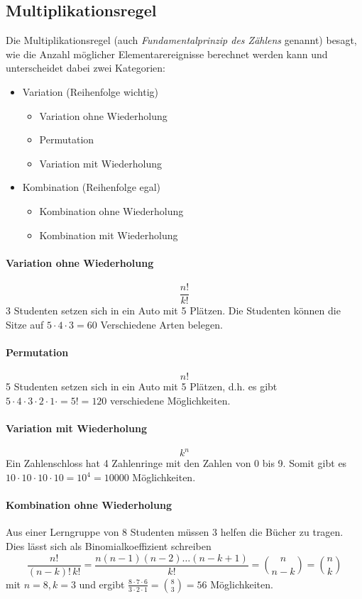 \subsection{Multiplikationsregel}\label{sec:multiplikationsregel}
Die \gls{Multiplikationsregel} (auch \emph{Fundamentalprinzip des 
Zählens} genannt) besagt, wie die Anzahl möglicher Elementarereignisse
berechnet werden kann und unterscheidet dabei zwei Kategorien:
\begin{itemize}
	\item \gls{Variation} \hfill{} (Reihenfolge wichtig)
	\begin{itemize}
		\item Variation ohne Wiederholung
		\item \gls{Permutation}
		\item Variation mit Wiederholung
	\end{itemize}
	\item \gls{Kombination} \hfill{} (Reihenfolge egal)
	\begin{itemize}
		\item Kombination ohne Wiederholung
		\item Kombination mit Wiederholung
	\end{itemize}
\end{itemize}

\paragraph{Variation ohne Wiederholung}
\[ 
	\frac{n!}{k!} 
\]
3 Studenten setzen sich in ein Auto mit 5 Plätzen.
Die Studenten können die Sitze auf $5 \cdot 4 \cdot 3 = 60$
Verschiedene Arten belegen.
\paragraph{Permutation}
\[ 
	n! 
\]
5 Studenten setzen sich in ein Auto mit 5 Plätzen, 
d.h. es gibt 
$5 \cdot 4 \cdot 3 \cdot 2 \cdot 1 \cdot = 5! = 120$
verschiedene Möglichkeiten.
\paragraph{Variation mit Wiederholung}
\[ k^n \]
Ein Zahlenschloss hat 4 Zahlenringe mit den Zahlen von 0 bis 9.
Somit gibt es $10 \cdot 10 \cdot 10 \cdot 10 = 10^4 = 10000$ 
Möglichkeiten.

\paragraph{Kombination ohne Wiederholung}
Aus einer Lerngruppe von 8 Studenten müssen 3 helfen die
Bücher zu tragen. Dies lässt sich als \gls{Binomialkoeffizient}
schreiben 
\[ 
	\frac{n!}{(n-k)!\, k!} 
		= \frac{n(n-1)(n-2)\dots(n-k+1)}{k!} 
		= \binom{n}{n-k} 
		= \binom{n}{k} 
\]
mit $n=8, k=3$ und ergibt
$\frac{8 \cdot 7 \cdot 6}{3 \cdot 2 \cdot 1} = \binom{8}{3} = 56$
Möglichkeiten.
